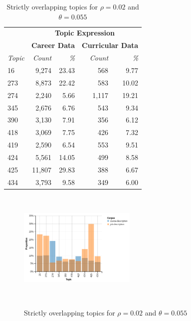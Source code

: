\begin{table}
  \centering
  \begin{tabular}{l r r r r}
    & \multicolumn{4}{c}{\small{\textbf{Topic Expression}}} \\
    & \multicolumn{2}{c}{\small{\textbf{Career Data}}} & \multicolumn{2}{c}{\small{\textbf{Curricular Data}}} \\
    {\small\textit{Topic}} & {\small\textit{Count}} & {\small\textit{\%}} & {\small\textit{Count}} & {\small\textit{\%}} \\
    \hline
    16 & 9,274 & 23.43 & 568 & 9.77 \\
    273 & 8,873 & 22.42 & 583 & 10.02 \\
    274 & 2,240 & 5.66 & 1,117 & 19.21 \\
    345 & 2,676 & 6.76 & 543 & 9.34 \\
    390 & 3,130 & 7.91 & 356 & 6.12 \\
    418 & 3,069 & 7.75 & 426 & 7.32 \\
    419 & 2,590 & 6.54 & 553 & 9.51 \\
    424 & 5,561 & 14.05 & 499 & 8.58 \\
    425 & 11,807 & 29.83 & 388 & 6.67 \\
    434 & 3,793 & 9.58 & 349 & 6.00
  \end{tabular}
  \caption{Strictly overlapping topics for $\rho=0.02$ and $\theta=0.055$}~\label{tab:overlap}
\end{table}


\begin{figure}
  \centering
  \includegraphics[width=0.5\textwidth]{figs/strict-overlap}
  \caption{Strictly overlapping topics for $\rho=0.02$ and $\theta=0.055$}~\label{fig:overlap}
\end{figure}

